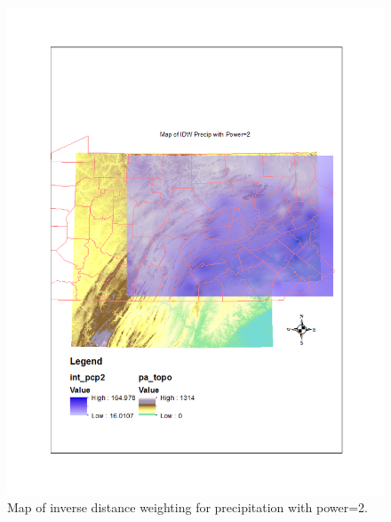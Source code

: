 \documentclass{article}\usepackage[]{graphicx}\usepackage[]{color}
\begin{document}
\begin{figure}
\includegraphics[scale=.9]{./figure/IDWprecip2}
\caption{Map of inverse distance weighting for precipitation with power=2.}
\label{IDWprecip2}
\end{figure}
\end{document}
